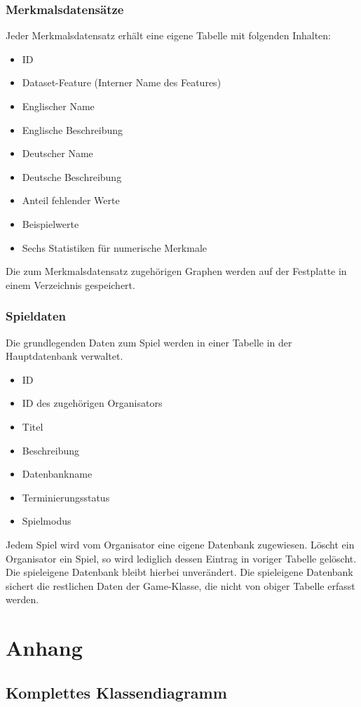 \documentclass[a4paper]{scrreprt}
\begin{document}
	\subsection{Merkmalsdatensätze}
	Jeder Merkmalsdatensatz erhält eine eigene Tabelle mit folgenden Inhalten:
	\begin{itemize}
		\item ID
		\item Dataset-Feature (Interner Name des Features)
		\item Englischer Name
		\item Englische Beschreibung
		\item Deutscher Name
		\item Deutsche Beschreibung
		\item Anteil fehlender Werte
		\item Beispielwerte
		\item Sechs Statistiken für numerische Merkmale
	\end{itemize}
	Die zum Merkmalsdatensatz zugehörigen Graphen werden auf der Festplatte in einem Verzeichnis gespeichert.
	\subsection{Spieldaten}
	Die grundlegenden Daten zum Spiel werden in einer Tabelle in der Hauptdatenbank verwaltet.
	\begin{itemize}
		\item ID
		\item ID des zugehörigen Organisators
		\item Titel
		\item Beschreibung
		\item Datenbankname
		\item Terminierungsstatus
		\item Spielmodus
	\end{itemize}
	Jedem Spiel wird vom Organisator eine eigene Datenbank zugewiesen.
	Löscht ein Organisator ein Spiel, so wird lediglich dessen Eintrag in voriger Tabelle gelöscht.
	Die spieleigene Datenbank bleibt hierbei unverändert.
	Die spieleigene Datenbank sichert die restlichen Daten der Game-Klasse, die nicht von obiger Tabelle erfasst werden.


	\chapter{Anhang}
	\section{Komplettes Klassendiagramm}
\end{document}
